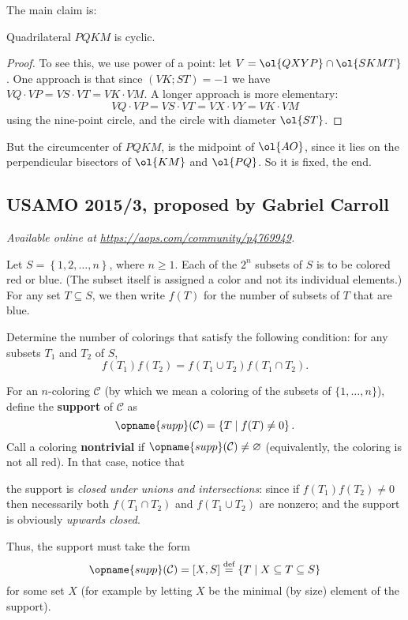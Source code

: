 \documentclass[11pt]{scrartcl}
\begin{document}
The main claim is:
\begin{claim*}
  Quadrilateral $PQKM$ is cyclic.
\end{claim*}
\begin{proof}
  To see this, we use power of a point: let $V = \ol{QXYP} \cap \ol{SKMT}$.
  One approach is that since $(VK;ST) = -1$
  we have $VQ \cdot VP = VS \cdot VT = VK \cdot VM$.
  A longer approach is more elementary:
  \[ VQ \cdot VP = VS \cdot VT = VX \cdot VY = VK \cdot VM \]
  using the nine-point circle, and the circle with diameter $\ol{ST}$.
\end{proof}
But the circumcenter of $PQKM$,
is the midpoint of $\ol{AO}$,
since it lies on the perpendicular bisectors of $\ol{KM}$ and $\ol{PQ}$.
So it is fixed, the end.
\pagebreak

\subsection{USAMO 2015/3, proposed by Gabriel Carroll}
\textsl{Available online at \url{https://aops.com/community/p4769949}.}
\begin{mdframed}[style=mdpurplebox,frametitle={Problem statement}]
Let $S = \left\{ 1,2,\dots,n \right\}$, where $n \ge 1$.
Each of the $2^n$ subsets of $S$ is to be colored red or blue.
(The subset itself is assigned a color and not its individual elements.)
For any set $T \subseteq S$,
we then write $f(T)$ for the number of subsets of $T$ that are blue.

Determine the number of colorings that satisfy the following condition:
for any subsets $T_1$ and $T_2$ of $S$,
\[ f(T_1)f(T_2) = f(T_1 \cup T_2)f(T_1 \cap T_2). \]
\end{mdframed}
For an $n$-coloring $\mathcal C$ (by which we mean a coloring of
the subsets of $\{1,\dots,n\}$),
define the \textbf{support} of $\mathcal C$ as
\[ \opname{supp}(\mathcal C) =
  \left\{ T \mid f(T) \neq 0 \right\}. \]
Call a coloring \textbf{nontrivial}
if $\opname{supp}(\mathcal C) \neq \varnothing$ (equivalently, the coloring is not all red).
In that case, notice that
\begin{itemize}
  \ii the support is
  \emph{closed under unions and intersections}:
  since if $f(T_1) f(T_2) \neq 0$ then necessarily
  both $f(T_1 \cap T_2)$ and $f(T_1 \cup T_2)$ are nonzero; and
  \ii the support is obviously \emph{upwards closed}.
\end{itemize}
Thus, the support must take the form
\[ \opname{supp}(\mathcal C)
  = [X,S]
  \overset{\text{def}}{=} \left\{ T \mid X \subseteq T \subseteq S \right\} \]
for some set $X$
(for example by letting $X$ be the minimal (by size) element of the support).
\end{document}
